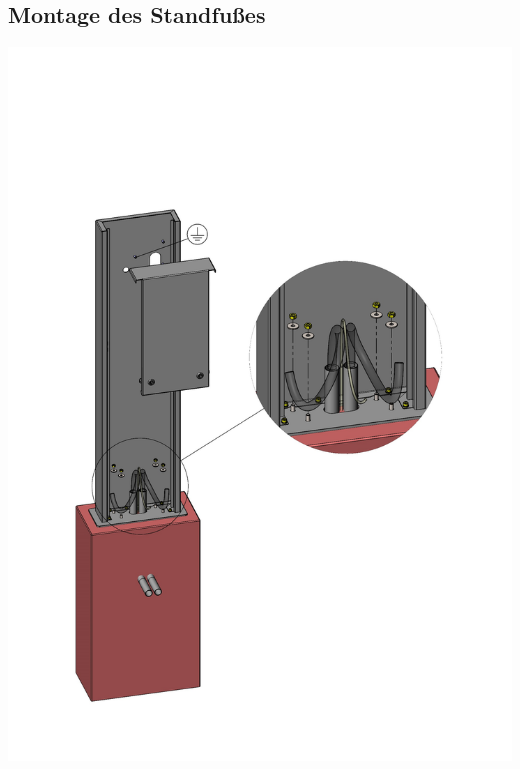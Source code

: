 \documentclass[a4paper,10pt]{article}
\begin{document}
	\subsection{Montage des Standfußes}
	\label{appendix_erection}
	\begin{center}
		\includegraphics[width=0.9\linewidth]{./img/stand_erection}
	\end{center}
\end{document}
